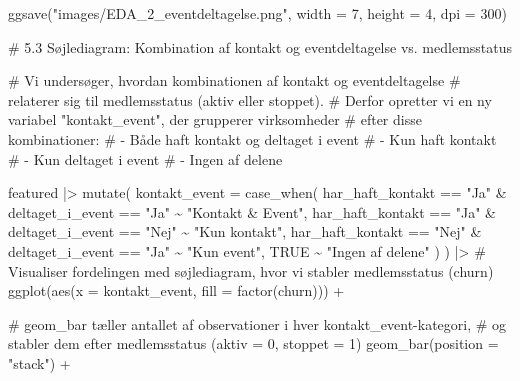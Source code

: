\documentclass[
  11pt,
  letterpaper,
  DIV=11,
  numbers=noendperiod]{scrartcl}
\newenvironment{Shaded}{\begin{snugshade}}{\end{snugshade}}
\newcommand{\AttributeTok}[1]{\textcolor[rgb]{0.40,0.45,0.13}{#1}}
\newcommand{\CommentTok}[1]{\textcolor[rgb]{0.37,0.37,0.37}{#1}}
\newcommand{\ConstantTok}[1]{\textcolor[rgb]{0.56,0.35,0.01}{#1}}
\newcommand{\DecValTok}[1]{\textcolor[rgb]{0.68,0.00,0.00}{#1}}
\newcommand{\FunctionTok}[1]{\textcolor[rgb]{0.28,0.35,0.67}{#1}}
\newcommand{\NormalTok}[1]{\textcolor[rgb]{0.00,0.23,0.31}{#1}}
\newcommand{\SpecialCharTok}[1]{\textcolor[rgb]{0.37,0.37,0.37}{#1}}
\newcommand{\StringTok}[1]{\textcolor[rgb]{0.13,0.47,0.30}{#1}}
\begin{document}
\begin{Shaded}
\begin{Highlighting}[]
\FunctionTok{ggsave}\NormalTok{(}\StringTok{"images/EDA\_2\_eventdeltagelse.png"}\NormalTok{, }\AttributeTok{width =} \DecValTok{7}\NormalTok{, }\AttributeTok{height =} \DecValTok{4}\NormalTok{, }\AttributeTok{dpi =} \DecValTok{300}\NormalTok{)}


\CommentTok{\# 5.3 Søjlediagram: Kombination af kontakt og eventdeltagelse vs. medlemsstatus}


\CommentTok{\# Vi undersøger, hvordan kombinationen af kontakt og eventdeltagelse }
\CommentTok{\# relaterer sig til medlemsstatus (aktiv eller stoppet).}
\CommentTok{\# Derfor opretter vi en ny variabel "kontakt\_event", der grupperer virksomheder}
\CommentTok{\# efter disse kombinationer:}
\CommentTok{\# {-} Både haft kontakt og deltaget i event}
\CommentTok{\# {-} Kun haft kontakt}
\CommentTok{\# {-} Kun deltaget i event}
\CommentTok{\# {-} Ingen af delene}

\NormalTok{featured }\SpecialCharTok{|\textgreater{}} 
  \FunctionTok{mutate}\NormalTok{(}
    \AttributeTok{kontakt\_event =} \FunctionTok{case\_when}\NormalTok{(}
\NormalTok{      har\_haft\_kontakt }\SpecialCharTok{==} \StringTok{"Ja"} \SpecialCharTok{\&}\NormalTok{ deltaget\_i\_event }\SpecialCharTok{==} \StringTok{"Ja"}   \SpecialCharTok{\textasciitilde{}} \StringTok{"Kontakt \& Event"}\NormalTok{,    }
\NormalTok{      har\_haft\_kontakt }\SpecialCharTok{==} \StringTok{"Ja"} \SpecialCharTok{\&}\NormalTok{ deltaget\_i\_event }\SpecialCharTok{==} \StringTok{"Nej"}  \SpecialCharTok{\textasciitilde{}} \StringTok{"Kun kontakt"}\NormalTok{,        }
\NormalTok{      har\_haft\_kontakt }\SpecialCharTok{==} \StringTok{"Nej"} \SpecialCharTok{\&}\NormalTok{ deltaget\_i\_event }\SpecialCharTok{==} \StringTok{"Ja"}  \SpecialCharTok{\textasciitilde{}} \StringTok{"Kun event"}\NormalTok{,          }
      \ConstantTok{TRUE} \SpecialCharTok{\textasciitilde{}} \StringTok{"Ingen af delene"}                                                   
\NormalTok{    )}
\NormalTok{  ) }\SpecialCharTok{|\textgreater{}} 
  \CommentTok{\# Visualiser fordelingen med søjlediagram, hvor vi stabler medlemsstatus (churn)}
  \FunctionTok{ggplot}\NormalTok{(}\FunctionTok{aes}\NormalTok{(}\AttributeTok{x =}\NormalTok{ kontakt\_event, }\AttributeTok{fill =} \FunctionTok{factor}\NormalTok{(churn))) }\SpecialCharTok{+}
  
  \CommentTok{\# geom\_bar tæller antallet af observationer i hver kontakt\_event{-}kategori,}
  \CommentTok{\# og stabler dem efter medlemsstatus (aktiv = 0, stoppet = 1)}
  \FunctionTok{geom\_bar}\NormalTok{(}\AttributeTok{position =} \StringTok{"stack"}\NormalTok{) }\SpecialCharTok{+}
  

\end{Highlighting}
\end{Shaded}
\end{document}
